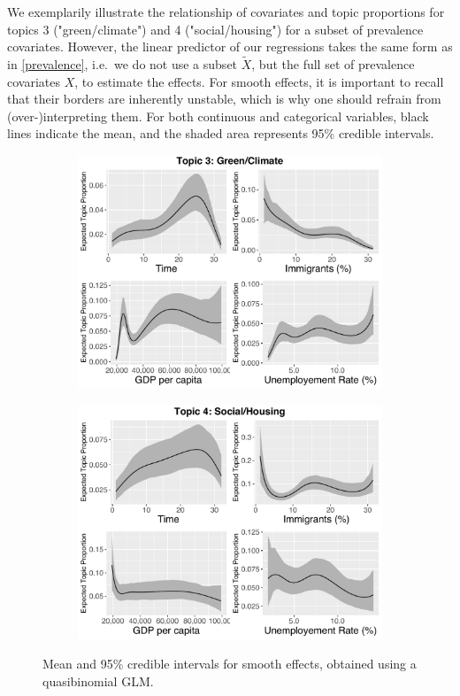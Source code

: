 We exemplarily illustrate the relationship of covariates and topic proportions for topics 3 ("green/climate") and 4 ("social/housing") for a subset of prevalence covariates. However, the linear predictor of our regressions takes the same form as in  \eqref{prevalence}, i.e.\ we do not use a subset $\tilde{X}$, but the full set of prevalence covariates $X$, to estimate the effects. For smooth effects, it is important to recall that their borders are inherently unstable, which is why one should refrain from (over-)interpreting them. For both continuous and categorical variables, black lines indicate the mean, and the shaded area represents 95\% credible intervals.

\begin{figure}[h!]
  \centering
  \captionsetup{justification=centering,margin=2cm}
  \begin{subfigure}[b]{0.49\linewidth}
    \includegraphics[width=\linewidth]{../plots/4_4/quasi_t3_cont.pdf}
  \end{subfigure}
  \begin{subfigure}[b]{0.49\linewidth}
    \includegraphics[width=\linewidth]{../plots/4_4/quasi_t4_cont.pdf}
  \end{subfigure}
  \caption{Mean and 95\% credible intervals for smooth effects, obtained using a quasibinomial GLM.}
  \label{fig:coffee}
\end{figure}

